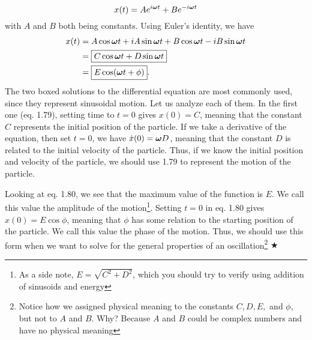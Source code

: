 \begin{equation}
    x(t) = Ae^{i\boldsymbol{\omega} t}+Be^{-i\boldsymbol{\omega} t}
\end{equation}
\noindent with $A$ and $B$ both being constants. Using Euler's identity, we have 
\begin{align}
    x(t) &= A\cos \boldsymbol{\omega} t + iA\sin\boldsymbol{\omega} t + B\cos \boldsymbol{\omega} t - iB\sin\boldsymbol{\omega} t\nonumber \\
    &= \boxed{C\cos \boldsymbol{\omega} t + D\sin \boldsymbol{\omega} t} \\
    &= \boxed{E\cos(\boldsymbol{\omega} t + \phi)}.
\end{align}
\noindent The two boxed solutions to the differential equation are most commonly used, since they represent sinusoidal motion. Let us analyze each of them. In the first one (eq. 1.79), setting time to $t=0$ gives $x(0) = C$, meaning that the constant $C$ represents the initial position of the particle. If we take a derivative of the equation, then set $t=0$, we have $\dot{x}(0) = \boldsymbol{\omega} D$, meaning that the constant $D$ is related to the initial velocity of the particle. Thus, if we know the initial position and velocity of the particle, we should use 1.79 to represent the motion of the particle. 

\noindent Looking at eq. 1.80, we see that the maximum value of the function is $E$. We call this value the amplitude of the motion\footnote{As a side note, $E = \sqrt{C^2 + D^2}$, which you should try to verify using addition of sinusoids and energy}. Setting $t=0$ in eq. 1.80 gives $x(0) = E\cos \phi$, meaning that $\phi$ has some relation to the starting position of the particle. We call this value the phase of the motion. Thus, we should use this form when we want to solve for the general properties of an oscillation\footnote{Notice how we assigned physical meaning to the constants $C, D, E,$ and $\phi$, but not to $A$ and $B$. Why? Because $A$ and $B$ could be complex numbers and have no physical meaning} $\bigstar$

